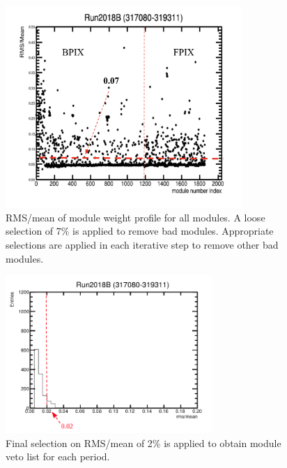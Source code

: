\begin{figure}[!htp]
\centering
\includegraphics[width=0.8\textwidth]{ashish_thesis/cut_selection.png}
\caption{%
   RMS/mean of module weight profile for all modules. A loose selection of 7\% is applied to remove bad modules. Appropriate selections are applied in each iterative step to remove other bad modules.
}
\label{fig:outliermodules}
\end{figure}

\begin{figure}[!htp]
\centering
\includegraphics[width=0.7\textwidth]{ashish_thesis/second_iteration_cut.png}
\caption{%
 Final selection on RMS/mean of 2\% is applied to obtain module veto list for each period.
}
\label{fig:sec_it_cut}
\end{figure}


